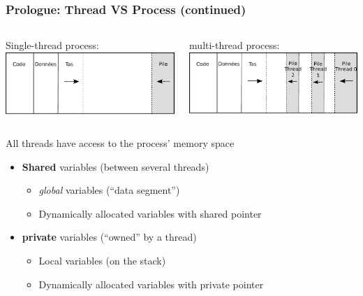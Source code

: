 \documentclass{beamer}
\begin{document}
\begin{frame}
  \frametitle{Prologue: Thread VS Process (continued)}

    \begin{columns}[t]
      \begin{center}
        Single-thread process:
        \includegraphics[height=0.2\textheight]{memoire_processus}
      \end{center}
      
      \begin{center}
        multi-thread process:
        \includegraphics[height=0.2\textheight]{memoire_processus_multi-thread}
      \end{center}
    \end{columns}

    \bigskip 

    \begin{block}{All threads have access to the process' memory space}
      \begin{itemize}
        
      \item \textbf{\alert{Shared}} variables (between several threads)
        \begin{itemize}
        \item \emph{global} variables (``data segment'')
        \item Dynamically allocated variables with shared pointer
        \end{itemize}
        
        
      \item \textbf{\alert{private}} variables (``owned'' by a thread)
        \begin{itemize}
        \item Local variables (on the stack)
        \item Dynamically allocated variables with private pointer
        \end{itemize}
      \end{itemize}
    \end{block}
  \end{frame}
\end{document}
